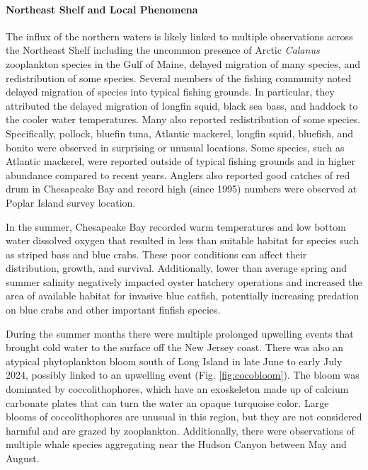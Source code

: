\documentclass[
  10pt,
]{article}
\begin{document}
\paragraph{Northeast Shelf and Local Phenomena}\label{northeast-shelf-and-local-phenomena}

The influx of the northern waters is likely linked to multiple observations across the Northeast Shelf including the uncommon presence of Arctic \emph{Calanus} zooplankton species in the Gulf of Maine, delayed migration of many species, and redistribution of some species. Several members of the fishing community noted delayed migration of species into typical fishing grounds. In particular, they attributed the delayed migration of longfin squid, black sea bass, and haddock to the cooler water temperatures. Many also reported redistribution of some species. Specifically, pollock, bluefin tuna, Atlantic mackerel, longfin squid, bluefish, and bonito were observed in surprising or unusual locations. Some species, such as Atlantic mackerel, were reported outside of typical fishing grounds and in higher abundance compared to recent years. Anglers also reported good catches of red drum in Chesapeake Bay and record high (since 1995) numbers were observed at Poplar Island survey location.

In the summer, Chesapeake Bay recorded warm temperatures and low bottom water dissolved oxygen that resulted in less than suitable habitat for species such as striped bass and blue crabs. These poor conditions can affect their distribution, growth, and survival. Additionally, lower than average spring and summer salinity negatively impacted oyster hatchery operations and increased the area of available habitat for invasive blue catfish, potentially increasing predation on blue crabs and other important finfish species.

During the summer months there were multiple prolonged upwelling events that brought cold water to the surface off the New Jersey coast. There was also an atypical phytoplankton bloom south of Long Island in late June to early July 2024, possibly linked to an upwelling event (Fig. \ref{fig:cocobloom}). The bloom was dominated by coccolithophores, which have an exoskeleton made up of calcium carbonate plates that can turn the water an opaque turquoise color. Large blooms of coccolithophores are unusual in this region, but they are not considered harmful and are grazed by zooplankton. Additionally, there were observations of multiple whale species aggregating near the Hudson Canyon between May and August.
\end{document}

